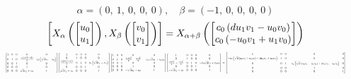 \documentclass[11pt]{article}
\theoremstyle{definition}
\begin{document}
\[
\alpha = \left( 0, \  1, \  0, \  0, \  0\right), \quad \beta = \left( -1, \  0, \  0, \  0, \  0\right)
\]
\[
\scaletoalign{\textwidth}{\left[ X_{\alpha}\left(\left[\begin{matrix}u_{0}\\u_{1}\end{matrix}\right]\right), X_{\beta}\left(\left[\begin{matrix}v_{0}\\v_{1}\end{matrix}\right]\right) \right] = X_{\alpha + \beta}\left(\left[\begin{matrix}c_{0} \left(d u_{1} v_{1} - u_{0} v_{0}\right)\\c_{0} \left(- u_{0} v_{1} + u_{1} v_{0}\right)\end{matrix}\right]\right)}
\]
\[
\scaletoalign{\textwidth}{{\left[\begin{matrix}1 & 0 & 0 & 0 & 0\\0 & 1 & 0 & \frac{c_{0} \left(d u_{1}^{2} - u_{0}^{2}\right)}{2} & c_{0} \left(\sqrt{d} u_{1} - u_{0}\right)\\0 & 0 & 1 & 0 & 0\\0 & 0 & 0 & 1 & 0\\0 & 0 & 0 & \sqrt{d} u_{1} + u_{0} & 1\end{matrix}\right]} {\left[\begin{matrix}1 & 0 & 0 & 0 & 0\\0 & 1 & 0 & 0 & 0\\\frac{c_{0} \left(d v_{1}^{2} - v_{0}^{2}\right)}{2} & 0 & 1 & 0 & c_{0} \left(\sqrt{d} v_{1} - v_{0}\right)\\0 & 0 & 0 & 1 & 0\\\sqrt{d} v_{1} + v_{0} & 0 & 0 & 0 & 1\end{matrix}\right]} {\left[\begin{matrix}1 & 0 & 0 & 0 & 0\\0 & 1 & 0 & \frac{c_{0} d u_{1}^{2}}{2} - \frac{c_{0} u_{0}^{2}}{2} & - c_{0} \sqrt{d} u_{1} + c_{0} u_{0}\\0 & 0 & 1 & 0 & 0\\0 & 0 & 0 & 1 & 0\\0 & 0 & 0 & - \sqrt{d} u_{1} - u_{0} & 1\end{matrix}\right]} {\left[\begin{matrix}1 & 0 & 0 & 0 & 0\\0 & 1 & 0 & 0 & 0\\\frac{c_{0} d v_{1}^{2}}{2} - \frac{c_{0} v_{0}^{2}}{2} & 0 & 1 & 0 & - c_{0} \sqrt{d} v_{1} + c_{0} v_{0}\\0 & 0 & 0 & 1 & 0\\- \sqrt{d} v_{1} - v_{0} & 0 & 0 & 0 & 1\end{matrix}\right]} = {\left[\begin{matrix}1 & 0 & 0 & 0 & 0\\- c_{0} \left(\sqrt{d} \left(u_{0} v_{1} - u_{1} v_{0}\right) - d u_{1} v_{1} + u_{0} v_{0}\right) & 1 & 0 & 0 & 0\\0 & 0 & 1 & - c_{0} \left(\sqrt{d} \left(u_{0} v_{1} - u_{1} v_{0}\right) + d u_{1} v_{1} - u_{0} v_{0}\right) & 0\\0 & 0 & 0 & 1 & 0\\0 & 0 & 0 & 0 & 1\end{matrix}\right]}}
\]
\end{document}
